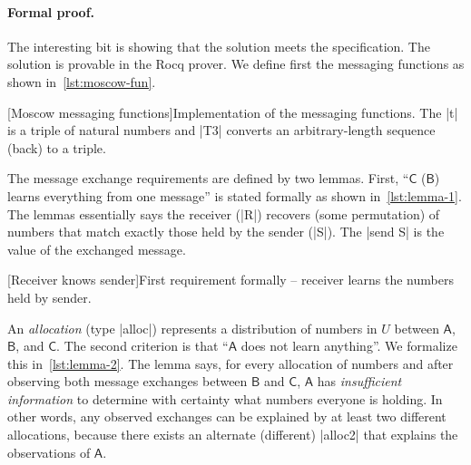 \paragraph{Formal proof.}
The interesting bit is showing that the solution meets the specification.
The solution is provable in the Rocq prover.
We define first the messaging functions as shown in~\autoref{lst:moscow-fun}.

\begin{center}
\begin{minipage}{\textwidth}
\captionsetup{type=lstlisting}
[Moscow messaging functions]{Implementation of the messaging functions. The \pr|t| is a triple of natural numbers and
\pr|T3| converts an arbitrary-length sequence (back) to a triple.}
\label{lst:moscow-fun}
\end{minipage}
\end{center}

The message exchange requirements are defined by two lemmas.
First, \enquote{\(\mathsf{C}\) (\resp \(\mathsf{B}\)) learns everything from one message} is stated formally as shown in~\autoref{lst:lemma-1}.
The lemmas essentially says the receiver (\pr|R|) recovers (some permutation) of numbers that match exactly those held by the sender (\pr|S|).
The \pr|send S| is the value of the exchanged message.

\begin{center}
\begin{minipage}{\textwidth}
\captionsetup{type=lstlisting}
[Receiver knows sender]{First requirement formally -- receiver learns the numbers held by sender.}
\label{lst:lemma-1}
\end{minipage}
\end{center}

An \emph{allocation} (type \pr|alloc|) represents a distribution of numbers in \(U\)
between \(\mathsf{A}\), \(\mathsf{B}\), and \(\mathsf{C}\).
The second criterion is that \enquote{\(\mathsf{A}\) does not learn anything}.
We formalize this in~\autoref{lst:lemma-2}.
The lemma says, for every allocation of numbers and after observing both message exchanges between \(\mathsf{B}\) and \(\mathsf{C}\),
\(\mathsf{A}\) has \emph{insufficient information}
to determine with certainty what numbers everyone is holding.
In other words, any observed exchanges can be explained by at least two different allocations,
because there exists an alternate (different) \pr|alloc2| that explains the observations of \(\mathsf{A}\).

